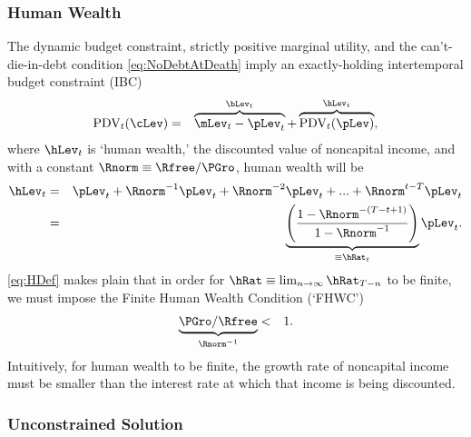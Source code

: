 \documentclass[titlepage]{\econtex}\providecommand{\texname}{BufferStockTheory}%
\begin{document}
\subsubsection{Human Wealth}
The dynamic budget constraint, strictly positive marginal utility, and the can't-die-in-debt condition \eqref{eq:NoDebtAtDeath} imply an exactly-holding intertemporal budget constraint (IBC)
\begin{eqnarray}
  \text{PDV}_{t}(\cLev) & = & \overbrace{\mLev_{t}-\pLev_{t}}^{\bLev_{t}}+\overbrace{\text{PDV}_{t}(\pLev)}^{\hLev_{t}}, \label{eq:IBCFinite}
\end{eqnarray}
where $\hLev_{t}$ is `human wealth,' the discounted value of
noncapital income, and with a constant $\Rnorm \equiv \Rfree/\PGro$, human wealth
will be
\begin{eqnarray}
  \hLev_{t} &  = & \pLev_{t}+\Rnorm^{-1} \pLev_{t} + \Rnorm^{-2} \pLev_{t} + ... + \Rnorm^{t-T} \pLev_{t} \notag
\\ & = & \underbrace{\left(\frac{1-\Rnorm^{-(T-t+1)}}{1-\Rnorm^{-1}}\right)}_{\equiv \hRat_{t}}\pLev_{t} \label{eq:HDef}
.
\end{eqnarray}
\eqref{eq:HDef} makes plain that in order for $\hRat \equiv \lim_{n \rightarrow
  \infty} \hRat_{T-n}$ to be finite, we must
impose the Finite Human Wealth Condition (`FHWC')
\begin{eqnarray}
  \underbrace{\PGro/\Rfree}_{\Rnorm^{-1}} & < & 1 \label{eq:FHWC}.
\end{eqnarray}
Intuitively, for human wealth to be finite, the growth rate of noncapital income must be smaller than
the interest rate at which that income is being discounted.

\subsubsection{Unconstrained Solution} \label{subsec:PFUncon}
\end{document}

